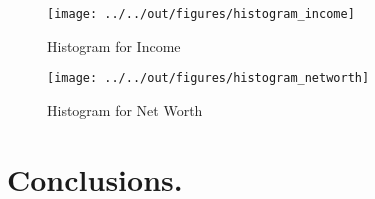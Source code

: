 \documentclass[11pt, a4paper, leqno]{article}
\begin{document}
\begin{figure}
    \caption{Histogram for Income}
    
    \texttt{[image: ../../out/figures/histogram\_income]}
    \label{fig:histincome}
\end{figure}

\begin{figure}
    \caption{Histogram for Net Worth}
    
    \texttt{[image: ../../out/figures/histogram\_networth]}
    \label{fig:histnetworth}
\end{figure}

\begin{table}
    \resizebox{\textwidth}{!}{}
    \label{tab:quintilesincome}
\end{table}


\begin{table}
    \resizebox{\textwidth}{!}{}
    \label{tab:quintilesnetworth}
\end{table}

\begin{table}
    \resizebox{\textwidth}{!}{}
    \label{tab:agepartition}
\end{table}

\section{Conclusions.}










\appendix

\begin{table}
    \resizebox{\textwidth}{!}{}
\end{table}

\begin{table}
    \resizebox{\textwidth}{!}{}
\end{table}

\end{document}
